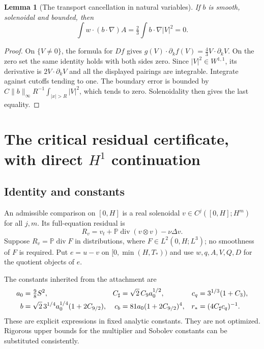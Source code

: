 \documentclass[11pt,a4paper]{article}
\newtheorem{lemma}[theorem]{Lemma}
\theoremstyle{definition}\newtheorem{definition}[theorem]{Definition}
\theoremstyle{remark}\newtheorem{remark}[theorem]{Remark}
\newcommand{\PP}{\mathbb P}
\newcommand{\norm}[1]{\lVert #1\rVert}
\newcommand{\diver}{\operatorname{div}}
\newcommand{\rstar}{r_*}
\newcommand{\Csharp}{C_\sharp}
\numberwithin{equation}{section}
\begin{document}
\begin{lemma}[The transport cancellation in natural variables]\label{lem:transport}
If $b$ is smooth, solenoidal and bounded, then
\begin{equation}\label{eq:transport}
 \int w\cdot(b\cdot\nabla)A
 =\tfrac23\int b\cdot\nabla|V|^2=0.
\end{equation}
\end{lemma}
\begin{proof}
On $\{V\ne0\}$, the formula for $Df$ gives $g(V)\cdot\partial_kf(V)=\frac43V\cdot\partial_kV$. On the zero set the same identity holds with both sides zero. Since $|V|^2\in W^{1,1}$, its derivative is $2V\cdot\partial_kV$ and all the displayed pairings are integrable. Integrate against cutoffs tending to one. The boundary error is bounded by $C\norm b_\infty R^{-1}\int_{|x|>R}|V|^2$, which tends to zero. Solenoidality then gives the last equality.
\end{proof}

\section{The critical residual certificate, with direct \texorpdfstring{$H^1$}{H1} continuation}
\label{sec:certificate}
\subsection{Identity and constants}
An admissible comparison on $[0,H]$ is a real solenoidal $v\in C^j([0,H];H^m)$ for all $j,m$. Its full-equation residual is
\begin{equation}\label{eq:residual}
 R_v=v_t+\PP\diver(v\otimes v)-\nu\Delta v.
\end{equation}
Suppose $R_v=\PP\diver F$ in distributions, where $F\in L^2(0,H;L^3)$; no smoothness of $F$ is required. Put $e=u-v$ on $[0,\min(H,T_*))$ and use $w,q,A,V,Q,D$ for the quotient objects of $e$.

The constants inherited from the attachment are
\begin{align}
 a_0&=\tfrac98S^2,&
 \Csharp&=\sqrt2\,C_9a_0^{1/2},&
 c_q&=3^{1/3}(1+C_3),\notag\\
 b&=\sqrt2\,3^{1/4}a_0^{1/4}(1+2C_{9/2}),&
 c_b&=81a_0(1+2C_{9/2})^4,&
 \rstar&=(4\Csharp c_q)^{-1}.
 \label{eq:constants}
\end{align}
These are explicit expressions in fixed analytic constants. They are not optimized. Rigorous upper bounds for the multiplier and Sobolev constants can be substituted consistently.
\end{document}
